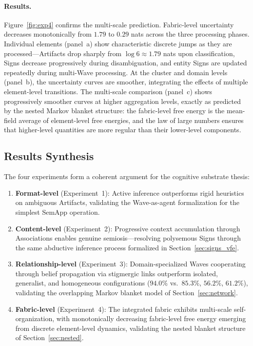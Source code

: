 \documentclass[11pt,a4paper]{article}
\theoremstyle{definition}
\begin{document}
\paragraph{Results.} Figure~\ref{fig:exp4} confirms the multi-scale prediction. Fabric-level uncertainty decreases monotonically from $1.79$ to $0.29$ nats across the three processing phases. Individual elements (panel~a) show characteristic discrete jumps as they are processed---Artifacts drop sharply from $\log 6 \approx 1.79$ nats upon classification, Signs decrease progressively during disambiguation, and entity Signs are updated repeatedly during multi-Wave processing. At the cluster and domain levels (panel~b), the uncertainty curves are smoother, integrating the effects of multiple element-level transitions. The multi-scale comparison (panel~c) shows progressively smoother curves at higher aggregation levels, exactly as predicted by the nested Markov blanket structure: the fabric-level free energy is the mean-field average of element-level free energies, and the law of large numbers ensures that higher-level quantities are more regular than their lower-level components.

\subsection{Results Synthesis}

The four experiments form a coherent argument for the cognitive substrate thesis:

\begin{enumerate}[noitemsep]
\item \textbf{Format-level} (Experiment~1): Active inference outperforms rigid heuristics on ambiguous Artifacts, validating the Wave-as-agent formalization for the simplest SemApp operation.
\item \textbf{Content-level} (Experiment~2): Progressive context accumulation through Associations enables genuine semiosis---resolving polysemous Signs through the same abductive inference process formalized in Section~\ref{sec:signs_vfe}.
\item \textbf{Relationship-level} (Experiment~3): Domain-specialized Waves cooperating through belief propagation via stigmergic links outperform isolated, generalist, and homogeneous configurations ($94.0\%$ vs.\ $85.3\%$, $56.2\%$, $61.2\%$), validating the overlapping Markov blanket model of Section~\ref{sec:network}.
\item \textbf{Fabric-level} (Experiment~4): The integrated fabric exhibits multi-scale self-organization, with monotonically decreasing fabric-level free energy emerging from discrete element-level dynamics, validating the nested blanket structure of Section~\ref{sec:nested}.
\end{enumerate}
\end{document}
